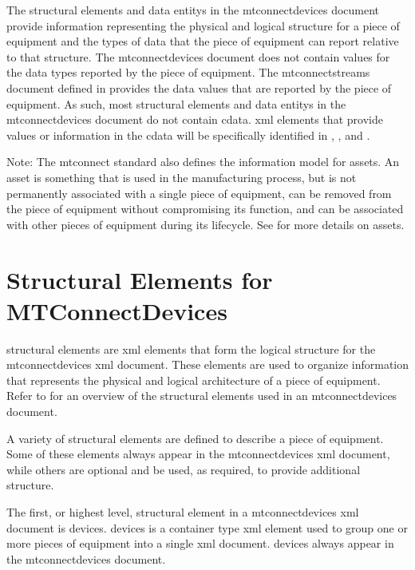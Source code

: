 The \glspl{structural element} and \glspl{data entity} in the \gls{mtconnectdevices} document provide information representing the physical and logical structure for a piece of equipment and the types of data that the piece of equipment can report relative to that structure.   The \gls{mtconnectdevices} document does not contain values for the data types reported by the piece of equipment.  The \gls{mtconnectstreams} document defined in  provides the data values that are reported by the piece of equipment.   As such, most \glspl{structural element} and \glspl{data entity} in the \gls{mtconnectdevices} document do not contain \gls{cdata}.  \gls{xml} elements that provide values or information in the \gls{cdata} will be specifically identified in , , and .

\begin{note}
Note:  The \gls{mtconnect standard} also defines the information model for \glspl{asset}.  An \gls{asset} is something that is used in the manufacturing process, but is not permanently associated with a single piece of equipment, can be removed from the piece of equipment without compromising its function, and can be associated with other pieces of equipment during its lifecycle.  See  for more details on \glspl{asset}.

\end{note}

\section{Structural Elements for MTConnectDevices}
\label{sec:Structural Elements for MTConnectDevices}
\glspl{structural element} are \gls{xml} elements that form the logical structure for the \gls{mtconnectdevices} \gls{xml} document.  These elements are used to organize information that represents the physical and logical architecture of a piece of equipment.  Refer to  for an overview of the \glspl{structural element} used in an \gls{mtconnectdevices} document.

A variety of \glspl{structural element} are defined to describe a piece of equipment.  Some of these elements \MUST always appear in the \gls{mtconnectdevices} \gls{xml} document, while others are optional and \may be used, as required, to provide additional structure.

The first, or highest level, \gls{structural element} in a \gls{mtconnectdevices} \gls{xml} document is \gls{devices}. \gls{devices} is a container type \gls{xml} element used to group one or more pieces of equipment into a single \gls{xml} document.  \gls{devices} \MUST always appear in the \gls{mtconnectdevices} document.

